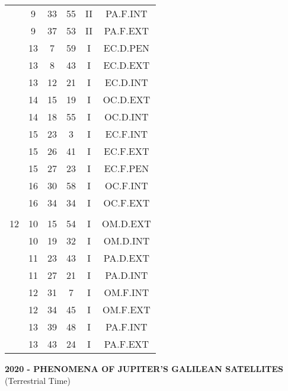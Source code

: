 \documentclass[12pt, a4paper]{article}
\begin{document}
\begin{multicols}{3}
{\begin{tabular}{c c c c c c}
	 	 	 	 & 9 & 33 & 55 & II & PA.F.INT\\%
	 	 	 	 & 9 & 37 & 53 & II & PA.F.EXT\\%
	 	 	 	 & 13 & 7 & 59 & I & EC.D.PEN\\%
	 	 	 	 & 13 & 8 & 43 & I & EC.D.EXT\\%
	 	 	 	 & 13 & 12 & 21 & I & EC.D.INT\\%
	 	 	 	 & 14 & 15 & 19 & I & OC.D.EXT\\%
	 	 	 	 & 14 & 18 & 55 & I & OC.D.INT\\%
	 	 	 	 & 15 & 23 & 3 & I & EC.F.INT\\%
	 	 	 	 & 15 & 26 & 41 & I & EC.F.EXT\\%
	 	 	 	 & 15 & 27 & 23 & I & EC.F.PEN\\%
	 	 	 	 & 16 & 30 & 58 & I & OC.F.INT\\%
	 	 	 	 & 16 & 34 & 34 & I & OC.F.EXT\\%
	 	 	 	 & & & & & \\%
	 	 	 	12 & 10 & 15 & 54 & I & OM.D.EXT\\%
	 	 	 	 & 10 & 19 & 32 & I & OM.D.INT\\%
	 	 	 	 & 11 & 23 & 43 & I & PA.D.EXT\\%
	 	 	 	 & 11 & 27 & 21 & I & PA.D.INT\\%
	 	 	 	 & 12 & 31 & 7 & I & OM.F.INT\\%
	 	 	 	 & 12 & 34 & 45 & I & OM.F.EXT\\%
	 	 	 	 & 13 & 39 & 48 & I & PA.F.INT\\%
	 	 	 	 & 13 & 43 & 24 & I & PA.F.EXT\\%
	 	 \end{tabular}
 	}
\end{multicols}
\pagebreak
\textbf{2020 - PHENOMENA OF JUPITER'S GALILEAN SATELLITES}\\(Terrestrial Time) 
\end{document}
